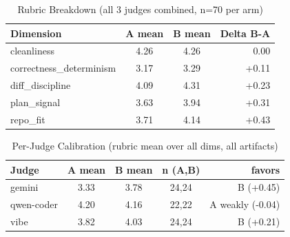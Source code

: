 
\begin{table}[t]
    \centering
    \caption{Rubric Breakdown (all 3 judges combined, n=70 per arm)}
    \label{tab:rubric_breakdown}
    \begin{tabular}{lccr}
        \toprule
        Dimension & A mean & B mean & Delta B-A \\
        \midrule
        cleanliness & 4.26 & 4.26 & 0.00 \\
        correctness_determinism & 3.17 & 3.29 & +0.11 \\
        diff_discipline & 4.09 & 4.31 & +0.23 \\
        plan_signal & 3.63 & 3.94 & +0.31 \\
        repo_fit & 3.71 & 4.14 & +0.43 \\
        \bottomrule
    \end{tabular}
\end{table}


\begin{table}[t]
    \centering
    \caption{Per-Judge Calibration (rubric mean over all dims, all artifacts)}
    \label{tab:judge_calibration}
    \begin{tabular}{lcccr}
        \toprule
        Judge & A mean & B mean & n (A,B) & favors \\
        \midrule
        gemini & 3.33 & 3.78 & 24,24 & B (+0.45) \\
        qwen-coder & 4.20 & 4.16 & 22,22 & A weakly (-0.04) \\
        vibe & 3.82 & 4.03 & 24,24 & B (+0.21) \\
        \bottomrule
    \end{tabular}
\end{table}

